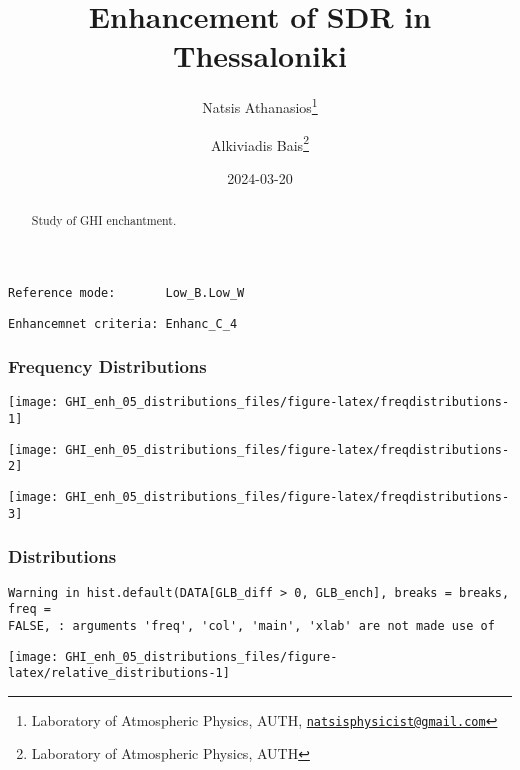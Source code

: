 \documentclass[
  10pt,
  a4paper,oneside]{article}
\title{Enhancement of SDR in Thessaloniki}
\author{Natsis Athanasios\footnote{Laboratory of Atmospheric Physics, AUTH, \href{mailto:natsisphysicist@gmail.com}{\nolinkurl{natsisphysicist@gmail.com}}} \and Alkiviadis Bais\footnote{Laboratory of Atmospheric Physics, AUTH}}
\date{2024-03-20}
\begin{document}
\maketitle
\begin{abstract}
Study of GHI enchantment.
\end{abstract}

{
\hypersetup{linkcolor=}
\setcounter{tocdepth}{4}
\tableofcontents
}
\begin{verbatim}
Reference mode:       Low_B.Low_W 
\end{verbatim}

\begin{verbatim}
Enhancemnet criteria: Enhanc_C_4 
\end{verbatim}

\FloatBarrier

\hypertarget{frequency-distributions}{%
\subsubsection{Frequency Distributions}\label{frequency-distributions}}

\begin{center}\texttt{[image: GHI\_enh\_05\_distributions\_files/figure-latex/freqdistributions-1]} \end{center}

\begin{center}\texttt{[image: GHI\_enh\_05\_distributions\_files/figure-latex/freqdistributions-2]} \end{center}

\begin{center}\texttt{[image: GHI\_enh\_05\_distributions\_files/figure-latex/freqdistributions-3]} \end{center}

\FloatBarrier

\hypertarget{distributions}{%
\subsubsection{Distributions}\label{distributions}}

\begin{verbatim}
Warning in hist.default(DATA[GLB_diff > 0, GLB_ench], breaks = breaks, freq =
FALSE, : arguments 'freq', 'col', 'main', 'xlab' are not made use of
\end{verbatim}

\begin{center}\texttt{[image: GHI\_enh\_05\_distributions\_files/figure-latex/relative\_distributions-1]} \end{center}
\end{document}
